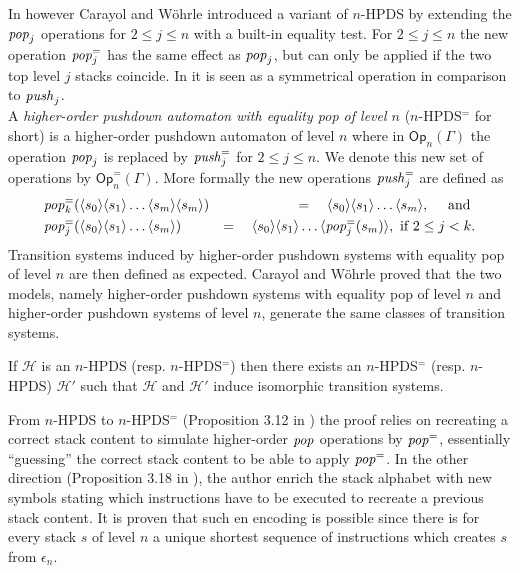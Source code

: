 \documentclass[a4paper,UKenglish,cleveref, autoref, thm-restate]{lipics-v2021}
\renewcommand{\H}{\mathcal{H}}
\newcommand{\Op}{\mathsf{Op}}
\begin{document}
In \cite{CaWoe03, Woeh05, carayol2006automates} however 
Carayol and W\"ohrle
 introduced a variant of $n$-HPDS by extending the 
$\text{\textit{pop}}_j$ operations for $2 \leq j \leq n$ with a built-in equality test. 
For $2 \leq j \leq n$ 
the new operation
$\text{\textit{pop}}_j^=$ has the same effect as $\text{\textit{pop}}_j$, but
can only be applied if the two top level $j$ stacks coincide.
In \cite{carayol2006automates} it is seen as a symmetrical operation in comparison to
$\text{\textit{push}}_j$.\\

A {\em higher-order pushdown automaton with equality pop of level $n$} ($n$-HPDS$^=$ for short) 
is a higher-order pushdown automaton of level $n$ where in
$\Op_n(\Gamma)$
 the operation 
 $\text{\textit{pop}}_j$  
  is replaced by 
$\text{\textit{push}}_j^=$
for $2 \leq j \leq n$.
We denote
this new set of operations by 
$\Op_n^=(\Gamma)$. 
More formally the new operations $\text{\textit{push}}_j^=$ are defined as
\begin{eqnarray*}
&\text{\textit{pop}}_k^=( \langle s_0 \rangle \langle s_1 \rangle \ldots  \langle s_m \rangle \langle s_m \rangle) &=\quad  \langle s_0 \rangle \langle s_1 \rangle \ldots \langle s_m \rangle , \quad \text{ and }\\
&\text{\textit{pop}}_j^=( \langle s_0 \rangle \langle s_1 \rangle \ldots \langle s_m \rangle) &=\quad \langle s_0 \rangle \langle s_1 \rangle \ldots 
\langle \text{\textit{pop}}_j^=(s_m) \rangle,
\text{ if } 2 \leq j < k. 
\end{eqnarray*}
%
%
%
%
Transition systems induced by higher-order pushdown systems with equality pop of level $n$
are then defined as expected.  
Carayol and W\"ohrle proved \cite{Woeh05, carayol2006automates} that the two models,
namely
higher-order pushdown systems with equality pop of level $n$
and
higher-order pushdown systems of level $n$,
generate the same classes of transition systems.





\begin{theorem}{\cite{Woeh05, carayol2006automates}}
If $\H$ is an $n$-HPDS (resp. $n$-HPDS$^=$) then there
exists an $n$-HPDS$^=$ (resp. $n$-HPDS) $\H'$ such that
$\H$ and $\H'$ 
induce isomorphic transition systems.
\end{theorem}



From $n$-HPDS to $n$-HPDS$^=$ (Proposition 3.12 in \cite{Woeh05}) the proof relies on recreating a correct stack content to simulate higher-order 
$\text{\textit{pop}}$ operations by $\text{\textit{pop}}^=$, essentially ``guessing'' the correct stack content to be able to apply $\text{\textit{pop}}^=$. 
In the other direction (Proposition 3.18 in \cite{Woeh05}), 
the author
enrich the stack alphabet with new symbols stating which 
instructions have to be executed to recreate a
previous stack content. It is proven that such en encoding is possible since
there is 
for every stack $s$ of level $n$
 a unique shortest sequence of instructions which creates $s$ from
$\epsilon_n$. \\
\end{document}
